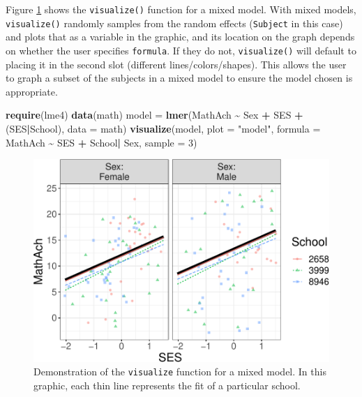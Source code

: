 \documentclass[
  man]{apa6}
\newenvironment{Shaded}{\begin{snugshade}}{\end{snugshade}}
\newcommand{\DataTypeTok}[1]{\textcolor[rgb]{0.13,0.29,0.53}{#1}}
\newcommand{\DecValTok}[1]{\textcolor[rgb]{0.00,0.00,0.81}{#1}}
\newcommand{\KeywordTok}[1]{\textcolor[rgb]{0.13,0.29,0.53}{\textbf{#1}}}
\newcommand{\NormalTok}[1]{#1}
\newcommand{\OperatorTok}[1]{\textcolor[rgb]{0.81,0.36,0.00}{\textbf{#1}}}
\newcommand{\StringTok}[1]{\textcolor[rgb]{0.31,0.60,0.02}{#1}}
\begin{document}
\normalsize

Figure \ref{fig:mixed} shows the \texttt{visualize()} function for a mixed model. With mixed models, \texttt{visualize()} randomly samples from the random effects (\texttt{Subject} in this case) and plots that as a variable in the graphic, and its location on the graph depends on whether the user specifies \texttt{formula}. If they do not, \texttt{visualize()} will default to placing it in the second slot (different lines/colors/shapes). This allows the user to graph a subset of the subjects in a mixed model to ensure the model chosen is appropriate.

\small

\begin{Shaded}
\begin{Highlighting}[]
\KeywordTok{require}\NormalTok{(lme4)}
\KeywordTok{data}\NormalTok{(math)}
\NormalTok{model =}\StringTok{ }\KeywordTok{lmer}\NormalTok{(MathAch }\OperatorTok{\textasciitilde{}}\StringTok{ }\NormalTok{Sex }\OperatorTok{+}\StringTok{ }\NormalTok{SES }\OperatorTok{+}\StringTok{ }\NormalTok{(SES}\OperatorTok{|}\NormalTok{School), }\DataTypeTok{data =}\NormalTok{ math)}
\KeywordTok{visualize}\NormalTok{(model, }
  \DataTypeTok{plot =} \StringTok{"model"}\NormalTok{,}
  \DataTypeTok{formula =}\NormalTok{ MathAch }\OperatorTok{\textasciitilde{}}\StringTok{  }\NormalTok{SES }\OperatorTok{+}\StringTok{ }\NormalTok{School}\OperatorTok{|}\StringTok{ }\NormalTok{Sex, }
  \DataTypeTok{sample =} \DecValTok{3}\NormalTok{)}
\end{Highlighting}
\end{Shaded}

\begin{figure}
\centering
\includegraphics{flexplot_psychmeth_files/figure-latex/mixed-1.pdf}
\caption{\label{fig:mixed}Demonstration of the \texttt{visualize} function for a mixed model. In this graphic, each thin line represents the fit of a particular school. \label{fig:mixed}}
\end{figure}
\end{document}
